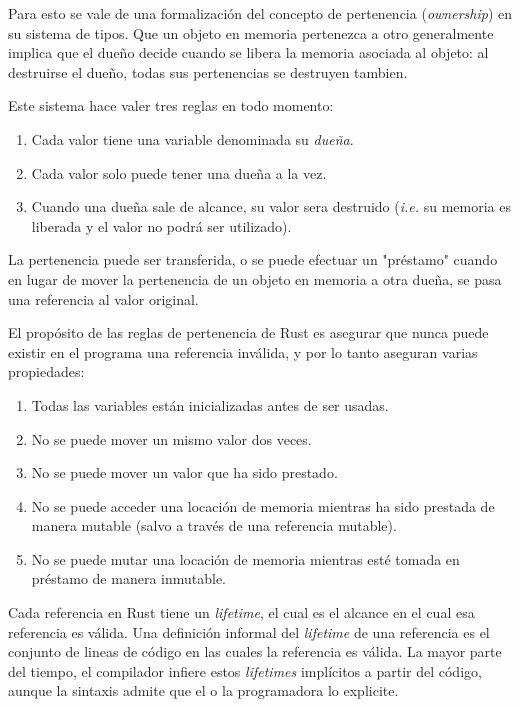 \documentclass[12pt, a4paper]{article}
\begin{document}
Para esto se vale de una formalización del concepto de pertenencia (\textit{ownership}) en su sistema de tipos.
Que un objeto en memoria pertenezca a otro generalmente implica que el dueño decide cuando se libera la memoria asociada al objeto: al destruirse el dueño, todas sus pertenencias se destruyen tambien.

Este sistema hace valer tres reglas en todo momento:

\begin{enumerate}
\item Cada valor tiene una variable denominada su \textit{dueña}.
\item Cada valor solo puede tener una dueña a la vez.
\item Cuando una dueña sale de alcance, su valor sera destruido (\textit{i.e.} su memoria es liberada y el valor no podrá ser utilizado).
\end{enumerate}

La pertenencia puede ser transferida, o se puede efectuar un "préstamo" cuando en lugar de mover la pertenencia de un objeto en memoria a otra dueña, se pasa una referencia al valor original.

El propósito de las reglas de pertenencia de Rust es asegurar que nunca puede existir en el programa una referencia inválida, y por lo tanto aseguran varias propiedades:

\begin{enumerate}
\item Todas las variables están inicializadas antes de ser usadas.
\item No se puede mover un mismo valor dos veces.
\item No se puede mover un valor que ha sido prestado.
\item No se puede acceder una locación de memoria mientras ha sido prestada de manera mutable (salvo a través de una referencia mutable).
\item No se puede mutar una locación de memoria mientras esté tomada en préstamo de manera inmutable.
\end{enumerate}

Cada referencia en Rust tiene un \textit{lifetime}, el cual es el alcance en el cual esa referencia es válida.
Una definición informal del \textit{lifetime} de una referencia es el conjunto de lineas de código en las cuales la referencia es válida.
La mayor parte del tiempo, el compilador infiere estos \textit{lifetimes} implícitos a partir del código, aunque la sintaxis admite que el o la programadora lo explicite.
\end{document}
